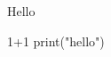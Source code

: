 \documentclass[a4paper]{article}
\begin{document}
Hello


\begin{pyblock}
1+1
print("hello")
\end{pyblock}
\end{document}
